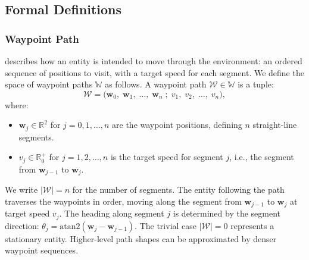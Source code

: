 \documentclass[conference]{IEEEtran}
\begin{document}
\subsection{Formal Definitions}
\label{sec:formal-definitions}
 
\subsubsection{Waypoint Path}
\label{sec:waypoint-path}
describes how an entity is intended to move through the environment: an ordered sequence of positions to visit, with a target speed for each segment. We define the space of waypoint paths $\mathbb{W}$ as follows. A waypoint path $\mathcal{W} \in \mathbb{W}$ is a tuple:
\begin{equation}
\label{eq:waypoint-path}
    \mathcal{W} = \big( \mathbf{w}_0,\; \mathbf{w}_1,\; \ldots,\; \mathbf{w}_n \;;\; v_1,\; v_2,\; \ldots,\; v_n \big),
\end{equation}
where:
\begin{itemize}
    \item $\mathbf{w}_j \in \mathbb{R}^2$ for $j = 0, 1, \ldots, n$ are the waypoint positions, defining $n$ straight-line segments.
    \item $v_j \in \mathbb{R}^+_0$ for $j = 1, 2, \ldots, n$ is the target speed for segment $j$, i.e., the segment from $\mathbf{w}_{j-1}$ to $\mathbf{w}_j$.
\end{itemize}
We write $|\mathcal{W}| = n$ for the number of segments. The entity following the path traverses the waypoints in order, moving along the segment from $\mathbf{w}_{j-1}$ to $\mathbf{w}_j$ at target speed $v_j$. The heading along segment $j$ is determined by the segment direction: $\theta_j = \mathrm{atan2}(\mathbf{w}_j - \mathbf{w}_{j-1})$. The trivial case $|\mathcal{W}| = 0$ represents a stationary entity. Higher-level path shapes can be approximated by denser waypoint sequences.
 
\end{document}
